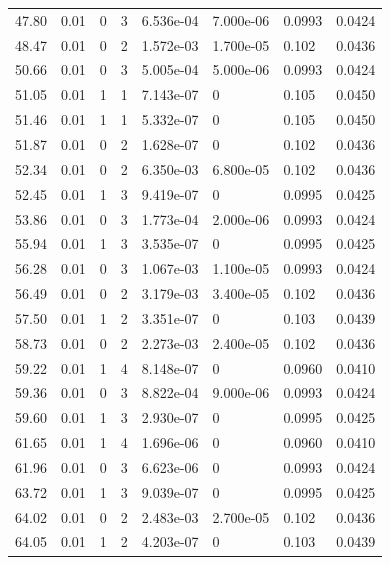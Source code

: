 \documentclass[preview]{standalone}
\begin{document}
{{{\begin{tabular}{L{1.2cm}C{1.2cm} C{0.3cm}C{0.5cm} C{1.4cm}C{1.4cm} C{1.4cm}C{1.4cm}}
  47.80  &  0.01  & 0     &  3 &  6.536e-04  & 7.000e-06  & 0.0993 &  0.0424   \\ 
  48.47  &  0.01  & 0     &  2 &  1.572e-03  & 1.700e-05  & 0.102 &  0.0436   \\ 
  50.66  &  0.01  & 0     &  3 &  5.005e-04  & 5.000e-06  & 0.0993 &  0.0424   \\ 
  51.05  &  0.01  & 1     &  1 &  7.143e-07  & 0  & 0.105 &  0.0450   \\ 
  51.46  &  0.01  & 1     &  1 &  5.332e-07  & 0  & 0.105 &  0.0450   \\ 
  51.87  &  0.01  & 0     &  2 &  1.628e-07  & 0  & 0.102 &  0.0436   \\ 
  52.34  &  0.01  & 0     &  2 &  6.350e-03  & 6.800e-05  & 0.102 &  0.0436   \\ 
  52.45  &  0.01  & 1     &  3 &  9.419e-07  & 0  & 0.0995 &  0.0425   \\ 
  53.86  &  0.01  & 0     &  3 &  1.773e-04  & 2.000e-06  & 0.0993 &  0.0424   \\ 
  55.94  &  0.01  & 1     &  3 &  3.535e-07  & 0  & 0.0995 &  0.0425   \\ 
  56.28  &  0.01  & 0     &  3 &  1.067e-03  & 1.100e-05  & 0.0993 &  0.0424   \\ 
  56.49  &  0.01  & 0     &  2 &  3.179e-03  & 3.400e-05  & 0.102 &  0.0436   \\ 
  57.50  &  0.01  & 1     &  2 &  3.351e-07  & 0  & 0.103 &  0.0439   \\ 
  58.73  &  0.01  & 0     &  2 &  2.273e-03  & 2.400e-05  & 0.102 &  0.0436   \\ 
  59.22  &  0.01  & 1     &  4 &  8.148e-07  & 0  & 0.0960 &  0.0410   \\ 
  59.36  &  0.01  & 0     &  3 &  8.822e-04  & 9.000e-06  & 0.0993 &  0.0424   \\ 
  59.60  &  0.01  & 1     &  3 &  2.930e-07  & 0  & 0.0995 &  0.0425   \\ 
  61.65  &  0.01  & 1     &  4 &  1.696e-06  & 0  & 0.0960 &  0.0410   \\ 
  61.96  &  0.01  & 0     &  3 &  6.623e-06  & 0  & 0.0993 &  0.0424   \\ 
  63.72  &  0.01  & 1     &  3 &  9.039e-07  & 0  & 0.0995 &  0.0425   \\ 
  64.02  &  0.01  & 0     &  2 &  2.483e-03  & 2.700e-05  & 0.102 &  0.0436   \\ 
  64.05  &  0.01  & 1     &  2 &  4.203e-07  & 0  & 0.103 &  0.0439   \\ 

\end{tabular}}}}
\end{document}
